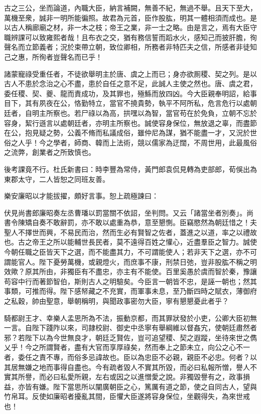 \begin{pinyinscope}
古之三公，坐而論道，內職大臣，納言補闕，無善不紀，無過不舉。且天下至大，萬機至衆，誠非一明所能徧照。故君為元首，臣作股肱，明其一體相須而成也。是以古人稱廊廟之材，非一木之枝；帝王之業，非一士之略。由是言之，焉有大臣守職辨課可以致雍熙者哉！且布衣之交，猶有務信誓而蹈水火，感知己而披肝膽，徇聲名而立節義者；況於束帶立朝，致位卿相，所務者非特匹夫之信，所感者非徒知己之惠，所徇者豈聲名而已乎！

諸蒙寵祿受重任者，不徒欲舉明主於唐、虞之上而已；身亦欲厠稷、契之列。是以古人不患於念治之心不盡，患於自任之意不足，此誠人主使之然也。唐、虞之君，委任稷、契、夔、龍而責成功，及其罪也，殛鯀而放四凶。今大臣親奉明詔，給事目下，其有夙夜在公，恪勤特立，當官不撓貴勢，執平不阿所私，危言危行以處朝廷者，自明主所察也。若尸祿以為高，拱嘿以為智，當官苟在於免負，立朝不忘於容身，絜行遜言以處朝廷者，亦明主所察也。誠使容身保位，無放退之辜，而盡節在公，抱見疑之勢，公義不脩而私議成俗，雖仲尼為謀，猶不能盡一才，又況於世俗之人乎！今之學者，師商、韓而上法術，競以儒家為迂闊，不周世用，此最風俗之流弊，創業者之所致慎也。

後考課竟不行。杜氏新書曰：時李豐為常侍，黃門郎袁侃見轉為吏部郎，荀俁出為東郡太守，二人皆恕之同班友善。

樂安廉昭以才能拔擢，頗好言事。恕上疏極諫曰：

伏見尚書郎廉昭奏左丞曹璠以罰當關不依詔，坐判問。又云「諸當坐者別奏」。尚書令陳矯自奏不敢辭罰，亦不敢以處重為恭，意至懇惻。臣竊愍然為朝廷惜之！夫聖人不擇世而興，不易民而治，然而生必有賢智之佐者，蓋進之以道，率之以禮故也。古之帝王之所以能輔世長民者，莫不遠得百姓之懽心，近盡羣臣之智力。誠使今朝任職之臣皆天下之選，而不能盡其力，不可謂能使人；若非天下之選，亦不可謂能官人。陛下憂勞萬機，或親燈火，而庶事不康，刑禁日弛，豈非股肱不稱之明效歟？原其所由，非獨臣有不盡忠，亦主有不能使。百里奚愚於虞而智於秦，豫讓苟容中行而著節智伯，斯則古人之明驗矣。今臣言一朝皆不忠，是誣一朝也；然其事類，可推而得。陛下感帑藏之不充實，而軍事未息，至乃斷四時之賦衣，薄御府之私穀，帥由聖意，舉朝稱明，與聞政事密勿大臣，寧有懇懇憂此者乎？

騎都尉王才、幸樂人孟思所為不法，振動京都，而其罪狀發於小吏，公卿大臣初無一言。自陛下踐阼以來，司隷校尉、御史中丞寧有舉綱維以督姦宄，使朝廷肅然者邪？若陛下以為今世無良才，朝廷乏賢佐，豈可追望稷、契之遐蹤，坐待來世之儁乂乎！今之所謂賢者，盡有大官而享厚祿矣，然而奉上之節未立，向公之心不一者，委任之責不專，而俗多忌諱故也。臣以為忠臣不必親，親臣不必忠。何者？以其居無嫌之地而事得自盡也。今有疏者毀人不實其所毀，而必曰私報所憎，譽人不實其所譽，而必曰私愛所親，左右或因之以進憎愛之說。非獨毀譽有之，政事損益，亦皆有嫌。陛下當思所以闡廣朝臣之心，篤厲有道之節，使之自同古人，望與竹帛耳。反使如廉昭者擾亂其間，臣懼大臣遂將容身保位，坐觀得失，為來世戒也！


\end{pinyinscope}
